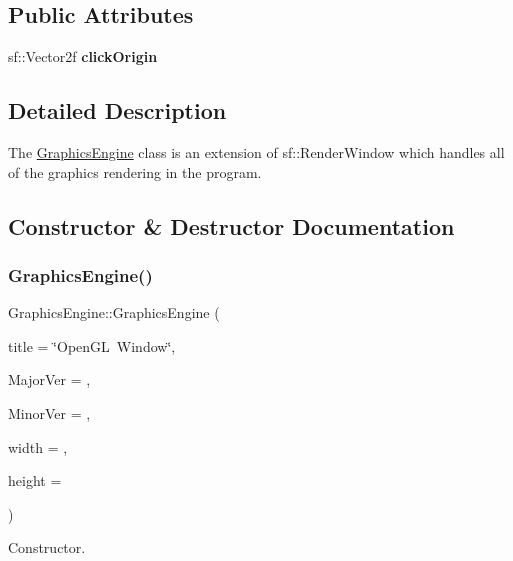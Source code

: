 \subsection*{Public Attributes}
\begin{DoxyCompactItemize}
\item 
\mbox{\label{class_graphics_engine_a799f855079745093d56161b88c2c1b52}} 
sf\+::\+Vector2f {\bfseries click\+Origin}
\end{DoxyCompactItemize}


\subsection{Detailed Description}
The \hyperlink{class_graphics_engine}{Graphics\+Engine} class is an extension of sf\+::\+Render\+Window which handles all of the graphics rendering in the program. 

\subsection{Constructor \& Destructor Documentation}
\mbox{\label{class_graphics_engine_a458fa2b36f864e0820a0a54ad58ff1c3}} 
\subsubsection{\texorpdfstring{Graphics\+Engine()}{GraphicsEngine()}}
{\footnotesize\ttfamily Graphics\+Engine\+::\+Graphics\+Engine (\begin{DoxyParamCaption}\item[{std\+::string}]{title = {\ttfamily \char`\"{}OpenGL~Window\char`\"{}},  }\item[{G\+Lint}]{Major\+Ver = {},  }\item[{G\+Lint}]{Minor\+Ver = {},  }\item[{int}]{width = {},  }\item[{int}]{height = {} }\end{DoxyParamCaption})}



Constructor. 


